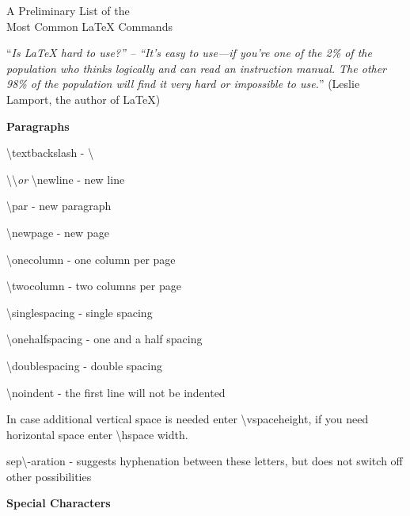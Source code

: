 \documentclass[a4paper,12pt,final]{article}
\begin{document}
\LARGE
\noindent 
A Preliminary List of the \\ Most Common \LaTeX{} Commands 

\normalsize
``\textit{Is {\LaTeX} hard to use?'' -- ``It's easy to use---if you're one of the 2\% of the population who thinks logically and can read an instruction manual. The other 98\% of the population will find it very hard or impossible to use.}'' (Leslie Lamport, the author of \LaTeX)

\vspace{.8em}
\large \textbf{Paragraphs}
\normalsize 

\textbackslash textbackslash - \textbackslash 

\textbackslash \textbackslash \textsl{or} \textbackslash newline - new line

\textbackslash par - new paragraph

\textbackslash newpage - new page

\textbackslash onecolumn - one column per page 

\textbackslash twocolumn - two columns per page 

\textbackslash singlespacing - single spacing 

\textbackslash onehalfspacing - one and a half spacing 

\textbackslash doublespacing - double spacing 

\textbackslash noindent - the first line will not be indented 

In case additional vertical space is needed enter \textbackslash vspace\lbrack height\rbrack, if you need horizontal space enter \textbackslash hspace \lbrack width\rbrack.

sep\textbackslash -aration - suggests hyphenation between these letters, but does not switch off other possibilities %



\large \textbf{Special Characters}
\normalsize
\end{document}
